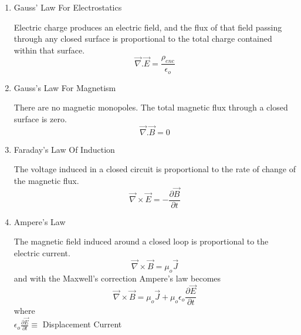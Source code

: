 \begin{enumerate}
   \item Gauss’ Law For Electrostatics

      Electric charge produces an electric field, and the flux of that field passing through any closed surface is proportional to the total charge contained within that surface.\\
      \begin{equation}
      \vec{\nabla}.\vec{E} = \frac{\rho_{enc}}{\epsilon_{o}}
      \end{equation}

   \item Gauss’s Law For Magnetism

   There are no magnetic monopoles. The total magnetic flux through a closed surface is zero.\\
   \begin{equation}
   \vec{\nabla}.\vec{B} = 0
   \end{equation}

   \item Faraday’s Law Of Induction

   The voltage induced in a closed circuit is proportional to the rate of change of the magnetic flux.\\
   \begin{equation}
   \vec{\nabla}\times\vec{E} = - \frac{\partial\vec{B}}{\partial t}
   \end{equation}

   \item Ampere’s Law

      The magnetic field induced around a closed loop is proportional to the electric current.\\
      \begin{equation}
      \vec{\nabla}\times\vec{B} =\mu_{o}\vec{J}
      \end{equation}
      and with the Maxwell's correction Ampere's law becomes\\
      \begin{equation}
      \vec{\nabla}\times\vec{B} =\mu_{o}\vec{J}+\mu_{o}\epsilon_{o}\frac{\partial\vec{E}}{\partial t}
      \end{equation}
      where\\

      $\epsilon_{o}\frac{\partial\vec{E}}{\partial t}\equiv$ Displacement Current

\end{enumerate}

